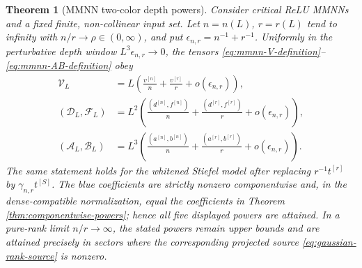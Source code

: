 \documentclass{article}
\newtheorem{theorem}{Theorem}[section]
\begin{document}
\begin{theorem}[MMNN two-color depth powers]
\label{thm:mmnn-powers}
Consider critical ReLU MMNNs and a fixed finite, non-collinear input set.
Let \(n=n(L)\), \(r=r(L)\) tend to infinity with
\(n/r\to\rho\in(0,\infty)\), and put
\(\epsilon_{n,r}=n^{-1}+r^{-1}\).  Uniformly in the perturbative depth window
\(L^3\epsilon_{n,r}\to0\), the tensors
\eqref{eq:mmnn-V-definition}--\eqref{eq:mmnn-AB-definition} obey
\begin{align}
\mathcal V_L&=L\left(\frac{v^{[n]}}n+\frac{v^{[r]}}r+o(\epsilon_{n,r})\right),
\label{eq:mmnn-V-power}\\
(\mathcal D_L,\mathcal F_L)
&=L^2\left(\frac{(d^{[n]},f^{[n]})}n
+\frac{(d^{[r]},f^{[r]})}r+o(\epsilon_{n,r})\right),
\label{eq:mmnn-DF-power}\\
(\mathcal A_L,\mathcal B_L)
&=L^3\left(\frac{(a^{[n]},b^{[n]})}n
+\frac{(a^{[r]},b^{[r]})}r+o(\epsilon_{n,r})\right).
\label{eq:mmnn-AB-power}
\end{align}
The same statement holds for the whitened Stiefel model after replacing
\(r^{-1}t^{[r]}\) by \(\gamma_{n,r}t^{[S]}\).  The blue coefficients are
strictly nonzero componentwise and, in the dense-compatible normalization,
equal the coefficients in Theorem \ref{thm:componentwise-powers}; hence all
five displayed powers are attained.  In a pure-rank limit \(n/r\to\infty\),
the stated powers remain upper bounds and are attained precisely in sectors
where the corresponding projected source
\eqref{eq:gaussian-rank-source} is nonzero.
\end{theorem}
\end{document}
